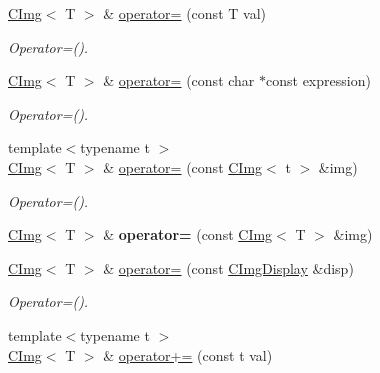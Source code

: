 \begin{DoxyCompactItemize}
\item 
\hyperlink{structcimg__library_1_1CImg}{CImg}$<$ T $>$ \& \hyperlink{structcimg__library_1_1CImg_a4ab78af35f2f570dafec8e449652e539}{operator=} (const T val)
\begin{DoxyCompactList}\small\item\em Operator=(). \item\end{DoxyCompactList}\item 
\hyperlink{structcimg__library_1_1CImg}{CImg}$<$ T $>$ \& \hyperlink{structcimg__library_1_1CImg_ac60a8646dac49ffcb08783717b6338b0}{operator=} (const char $\ast$const expression)
\begin{DoxyCompactList}\small\item\em Operator=(). \item\end{DoxyCompactList}\item 
{\footnotesize template$<$typename t $>$ }\\\hyperlink{structcimg__library_1_1CImg}{CImg}$<$ T $>$ \& \hyperlink{structcimg__library_1_1CImg_ab8993b2170b87343f86f3e07fe0b7348}{operator=} (const \hyperlink{structcimg__library_1_1CImg}{CImg}$<$ t $>$ \&img)
\begin{DoxyCompactList}\small\item\em Operator=(). \item\end{DoxyCompactList}\item 
\hypertarget{structcimg__library_1_1CImg_aa0b4012f3f99e34ac922a481d13e182f}{
\hyperlink{structcimg__library_1_1CImg}{CImg}$<$ T $>$ \& {\bfseries operator=} (const \hyperlink{structcimg__library_1_1CImg}{CImg}$<$ T $>$ \&img)}
\label{structcimg__library_1_1CImg_aa0b4012f3f99e34ac922a481d13e182f}

\item 
\hypertarget{structcimg__library_1_1CImg_a506c81db5628c9e4b941c358945a7e27}{
\hyperlink{structcimg__library_1_1CImg}{CImg}$<$ T $>$ \& \hyperlink{structcimg__library_1_1CImg_a506c81db5628c9e4b941c358945a7e27}{operator=} (const \hyperlink{structcimg__library_1_1CImgDisplay}{CImgDisplay} \&disp)}
\label{structcimg__library_1_1CImg_a506c81db5628c9e4b941c358945a7e27}

\begin{DoxyCompactList}\small\item\em Operator=(). \item\end{DoxyCompactList}\item 
\hypertarget{structcimg__library_1_1CImg_af953b216980f8519642514380f3bfdba}{
{\footnotesize template$<$typename t $>$ }\\\hyperlink{structcimg__library_1_1CImg}{CImg}$<$ T $>$ \& \hyperlink{structcimg__library_1_1CImg_af953b216980f8519642514380f3bfdba}{operator+=} (const t val)}
\label{structcimg__library_1_1CImg_af953b216980f8519642514380f3bfdba}


\end{DoxyCompactItemize}

